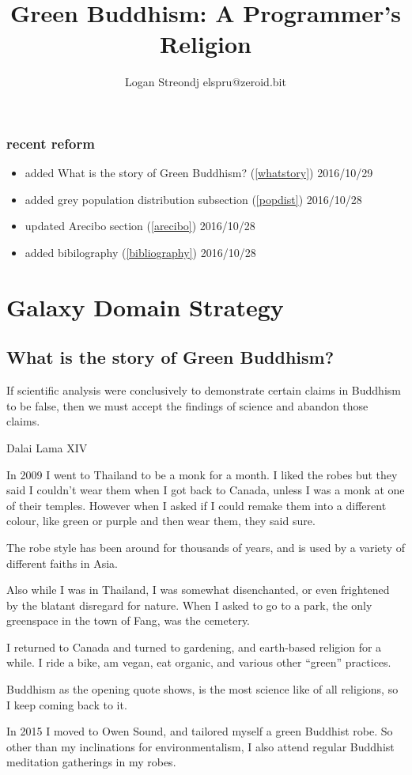 \documentclass{report}
\title{Green Buddhism: A Programmer's Religion}
\author{Logan Streondj elspru@zeroid.bit}
\begin{document}
\section{recent reform}
\begin{itemize}
  \item added What is the story of Green Buddhism? (\ref{whatstory}) 2016/10/29
  \item added grey population distribution subsection (\ref{popdist})
2016/10/28
 \item updated Arecibo section (\ref{arecibo}) 2016/10/28
 \item added bibilography (\ref{bibliography}) 2016/10/28
\end{itemize}

\tableofcontents
\part{Galaxy Domain Strategy}

\chapter{What is the story of Green Buddhism?}
\epigraph{If scientific analysis were conclusively to demonstrate certain claims
in Buddhism to be false, then we must accept the findings of science and abandon
those claims.}
{Dalai Lama XIV\cite{singleAtom}}
\label{whatstory}
In 2009 I went to Thailand to be a monk for a month. I liked the robes but they
said I couldn't wear them when I got back to Canada, unless I was a monk at one
of their temples. However when I asked if I could remake them into a different 
colour, like green or purple and then wear them, they said sure. 

The robe style has been around for thousands of years, and is used by a variety
of different faiths in Asia. 

Also while I was in Thailand, I was somewhat disenchanted, or even frightened by
the blatant disregard for nature. When I asked to go to a park, the only
greenspace in the town of Fang, was the cemetery. 

I returned to Canada and turned to gardening, and earth-based religion for a
while. I ride a bike, am vegan, eat organic, and various other ``green''
practices.

Buddhism as the opening quote shows, is the most science like of all religions,
so I keep coming back to it. 

In 2015 I moved to Owen Sound, and tailored myself a green Buddhist robe. So
other than my inclinations for environmentalism, I also attend regular Buddhist
meditation gatherings in my robes.
\end{document}
